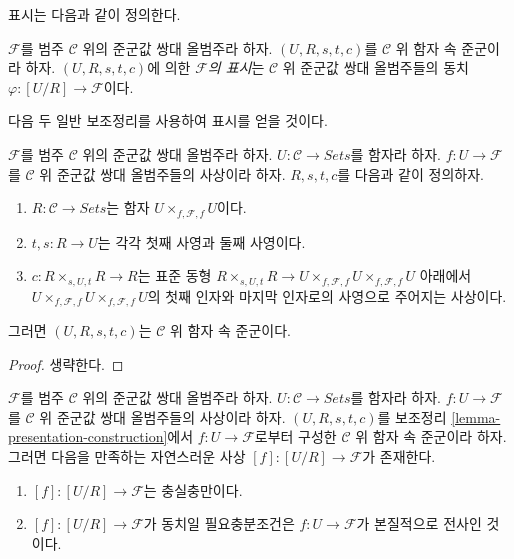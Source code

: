 \noindent
표시는 다음과 같이 정의한다.

\begin{definition}
\label{definition-presentation}
$\mathcal{F}$를 범주 $\mathcal{C}$ 위의 준군값 쌍대 올범주라 하자.
$(U, R, s, t, c)$를 $\mathcal{C}$ 위 함자 속 준군이라 하자.
$(U, R, s, t, c)$에 의한 {\it $\mathcal{F}$의 표시}는
$\mathcal{C}$ 위 준군값 쌍대 올범주들의 동치
$\varphi : [U/R] \to \mathcal{F}$이다.
\end{definition}

\noindent
다음 두 일반 보조정리를 사용하여 표시를 얻을 것이다.

\begin{lemma}
\label{lemma-presentation-construction}
$\mathcal{F}$를 범주 $\mathcal{C}$ 위의 준군값 쌍대 올범주라 하자.
$U : \mathcal{C} \to \textit{Sets}$를 함자라 하자.
$f : U \to \mathcal{F}$를 $\mathcal{C}$ 위 준군값 쌍대 올범주들의
사상이라 하자. $R, s, t, c$를 다음과 같이 정의하자.
\begin{enumerate}
\item $R : \mathcal{C} \to \textit{Sets}$는 함자
$U \times_{f, \mathcal{F}, f} U$이다.
\item $t, s : R \to U$는 각각 첫째 사영과 둘째 사영이다.
\item $c : R \times_{s, U, t} R \to R$는 표준 동형
$R \times_{s, U, t} R \to
U \times_{f, \mathcal{F}, f} U \times_{f, \mathcal{F}, f} U$ 아래에서
$U \times_{f, \mathcal{F}, f} U \times_{f, \mathcal{F}, f} U$의
첫째 인자와 마지막 인자로의 사영으로 주어지는 사상이다.
\end{enumerate}
그러면 $(U, R, s, t, c)$는 $\mathcal{C}$ 위 함자 속 준군이다.
\end{lemma}

\begin{proof}
생략한다.
\end{proof}

\begin{lemma}
\label{lemma-presentation-morphism}
$\mathcal{F}$를 범주 $\mathcal{C}$ 위의 준군값 쌍대 올범주라 하자.
$U : \mathcal{C} \to \textit{Sets}$를 함자라 하자.
$f : U \to \mathcal{F}$를 $\mathcal{C}$ 위 준군값 쌍대 올범주들의
사상이라 하자. $(U, R, s, t, c)$를 보조정리
\ref{lemma-presentation-construction}에서 $f : U \to \mathcal{F}$로부터
구성한 $\mathcal{C}$ 위 함자 속 준군이라 하자. 그러면 다음을 만족하는
자연스러운 사상 $[f] : [U/R] \to \mathcal{F}$가 존재한다.
\begin{enumerate}
\item $[f]: [U/R] \to \mathcal{F}$는 충실충만이다.
\item $[f]: [U/R] \to \mathcal{F}$가 동치일 필요충분조건은
$f : U \to \mathcal{F}$가 본질적으로 전사인 것이다.
\end{enumerate}
\end{lemma}

